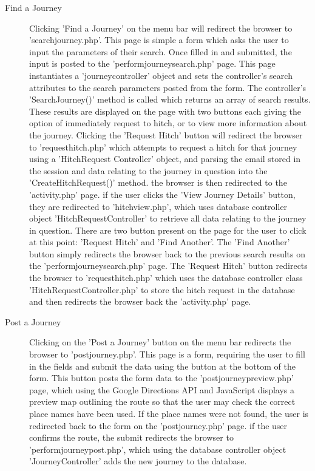 \begin{description}
		\item[Find a Journey] Clicking 'Find a Journey' on the menu bar will redirect the browser to 'search\textunderscore journey.php'. This page is simple a form which asks the user to input the parameters of their search. Once filled in and submitted, the input is posted to the 'perform\textunderscore journey\textunderscore search.php' page. This page instantiates a 'journey\textunderscore controller' object and sets the controller's search attributes to the search parameters posted from the form. The controller's 'SearchJourney()' method is called which returns an array of search results. These results are displayed on the page with two buttons each giving the option of immediately request to hitch, or to view more information about the journey. Clicking the 'Request Hitch' button will redirect the browser to 'request\textunderscore hitch.php' which attempts to request a hitch for that journey using a 'Hitch\textunderscore Request \textunderscore Controller' object, and parsing the email stored in the session and data relating to the journey in question into the 'CreateHitchRequest()' method. the browser is then redirected to the 'activity.php' page. if the user clicks the 'View Journey Details' button, they are redirected to 'hitch\textunderscore view.php', which uses database controller object 'Hitch\textunderscore Request\textunderscore Controller' to retrieve all data relating to the journey in question. There are two button present on the page for the user to click at this point: 'Request Hitch' and 'Find Another'. The 'Find Another' button simply redirects the browser back to the previous search results on the 'perform\textunderscore journey\textunderscore search.php' page. The 'Request Hitch' button redirects the browser to 'request\textunderscore hitch.php' which uses the database controller class 'Hitch\textunderscore Request\textunderscore Controller.php' to store the hitch request in the database and then redirects the browser back the 'activity.php' page.
		\item[Post a Journey] Clicking on the 'Post a Journey' button on the menu bar redirects the browser to 'post\textunderscore journey.php'. This page is a form, requiring the user to fill in the fields and submit the data using the button at the bottom of the form. This button posts the form data to the 'post\textunderscore journey\textunderscore preview.php' page, which using the Google Directions API \cite{google_directions_api} and JavaScript displays a preview map outlining the route so that the user may check the correct place names have been used. If the place names were not found, the user is redirected back to the form on the 'post\textunderscore journey.php' page. if the user confirms the route, the submit redirects the browser to 'perform\textunderscore journey\textunderscore post.php', which using the database controller object 'Journey\textunderscore Controller' adds the new journey to the database.
		\end{description}
		
